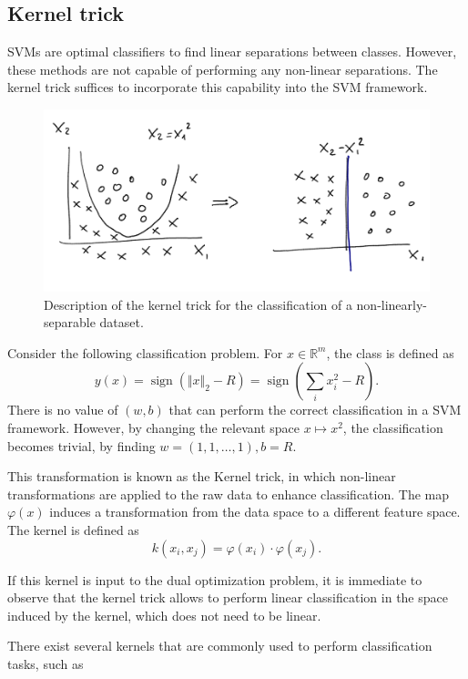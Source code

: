 \documentclass[]{report}
\newcommand{\sign}{\ensuremath{\operatorname{sign}}}
\begin{document}
\subsection{Kernel trick}
SVMs are optimal classifiers to find linear separations between classes. However, these methods are not capable of performing any non-linear separations. The kernel trick suffices to incorporate this capability into the SVM framework.

\begin{figure}
\centering
\includegraphics[width = .8\linewidth]{images/kernel trick}
\caption{Description of the kernel trick for the classification of a non-linearly-separable dataset. }
\label{fig.kernel_trick}
\end{figure}

Consider the following classification problem. For $x \in \mathbb R^m$, the class is defined as
\begin{equation}
y(x) = \sign(\Vert x \Vert_2 - R) = \sign\left( \sum_{i} x_i^2 - R\right). 
\end{equation}
There is no value of $(w, b)$ that can perform the correct classification in a SVM framework. However, by changing the relevant space $x \mapsto x^2$, the classification becomes trivial, by finding $w = (1, 1, \ldots, 1), b = R$. 

This transformation is known as the Kernel trick, in which non-linear transformations are applied to the raw data to enhance classification. The map $\varphi(x)$ induces a transformation from the data space to a different feature space. The kernel is defined as
\begin{equation}
k(x_i, x_j) = \varphi(x_i) \cdot \varphi(x_j).
\end{equation}

If this kernel is input to the dual optimization problem, it is immediate to observe that the kernel trick allows to perform linear classification in the space induced by the kernel, which does not need to be linear. 

There exist several kernels that are commonly used to perform classification tasks, such as
\end{document}
